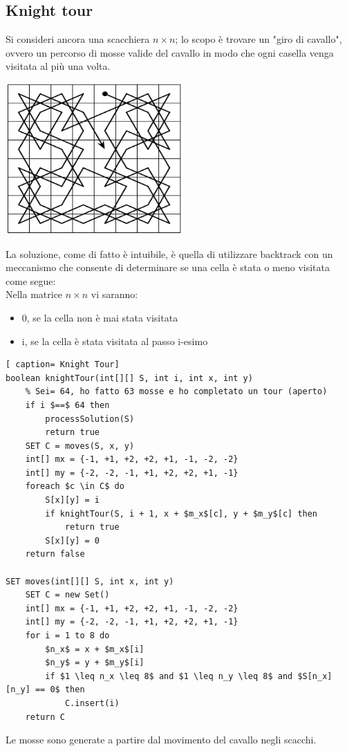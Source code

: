 \documentclass[../cheatSheetAlgoritmi.tex]{subfiles}
\begin{document}
\subsection{Knight tour}
Si consideri ancora una scacchiera $n \times n$; lo scopo è trovare un "giro di cavallo", ovvero un percorso di mosse valide del cavallo in modo che ogni casella venga visitata al più una volta.
\begin{center}
	\includegraphics{ ../img/backtracking_knight_tour}
\end{center}
La soluzione, come di fatto è intuibile, è quella di utilizzare backtrack con un meccanismo che consente di determinare se una cella è stata o meno visitata come segue: \\
Nella matrice $n \times n$ vi saranno:
\begin{itemize}
	\item 0, se la cella non è mai stata visitata
	\item i, se la cella è stata visitata al passo i-esimo
\end{itemize}
 \begin{lstlisting}[ caption= Knight Tour]
boolean knightTour(int[][] S, int i, int x, int y)
	% Sei= 64, ho fatto 63 mosse e ho completato un tour (aperto)
	if i $==$ 64 then
		processSolution(S)
		return true
	SET C = moves(S, x, y)
	int[] mx = {-1, +1, +2, +2, +1, -1, -2, -2}
	int[] my = {-2, -2, -1, +1, +2, +2, +1, -1}
	foreach $c \in C$ do
		S[x][y] = i
		if knightTour(S, i + 1, x + $m_x$[c], y + $m_y$[c] then
			return true
		S[x][y] = 0
	return false
	
SET moves(int[][] S, int x, int y)
	SET C = new Set()
	int[] mx = {-1, +1, +2, +2, +1, -1, -2, -2}
	int[] my = {-2, -2, -1, +1, +2, +2, +1, -1}
	for i = 1 to 8 do
		$n_x$ = x + $m_x$[i]
		$n_y$ = y + $m_y$[i]
		if $1 \leq n_x \leq 8$ and $1 \leq n_y \leq 8$ and $S[n_x][n_y] == 0$ then
			C.insert(i)
	return C
\end{lstlisting}
Le mosse sono generate a partire dal movimento del cavallo negli scacchi. \\
\end{document}
